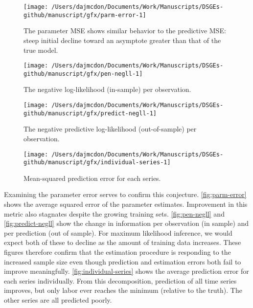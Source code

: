 \documentclass[11pt]{article}
\begin{document}
\begin{figure}[t]

{\centering \texttt{[image: /Users/dajmcdon/Documents/Work/Manuscripts/DSGEs-github/manuscript/gfx/parm-error-1]} 

}

\caption{The parameter MSE shows similar behavior to the predictive MSE: steep initial decline toward an asymptote greater than that of the true model.}\label{fig:parm-error}
\end{figure}

\begin{figure}[t]

{\centering \texttt{[image: /Users/dajmcdon/Documents/Work/Manuscripts/DSGEs-github/manuscript/gfx/pen-negll-1]} 

}

\caption{The negative log-likelihood (in-sample) per observation.}\label{fig:pen-negll}
\end{figure}

\begin{figure}[t]

{\centering \texttt{[image: /Users/dajmcdon/Documents/Work/Manuscripts/DSGEs-github/manuscript/gfx/predict-negll-1]} 

}

\caption{The negative predictive log-likelihood (out-of-sample) per observation.}\label{fig:predict-negll}
\end{figure}

\begin{figure}[t]

{\centering \texttt{[image: /Users/dajmcdon/Documents/Work/Manuscripts/DSGEs-github/manuscript/gfx/individual-series-1]} 

}

\caption{Mean-squared prediction error for each series.}\label{fig:individual-series}
\end{figure}

Examining the parameter error serves to confirm this conjecture.
\autoref{fig:parm-error} shows the average squared error of the
parameter estimates. Improvement in this metric also stagnates despite
the growing training sets. \autoref{fig:pen-negll} and
\autoref{fig:predict-negll} show the change in information per
observation (in sample) and per prediction (out of sample). For maximum
likelihood inference, we would expect both of these to decline as the
amount of training data increases. These figures therefore confirm that
the estimation procedure is responding to the increased sample size even
though prediction and estimation errors both fail to improve
meaningfully. \autoref{fig:individual-series} shows the average
prediction error for each series individually. From this decomposition,
prediction of all time series improves, but only labor ever reaches the
minimum (relative to the truth). The other series are all predicted
poorly.
\end{document}
